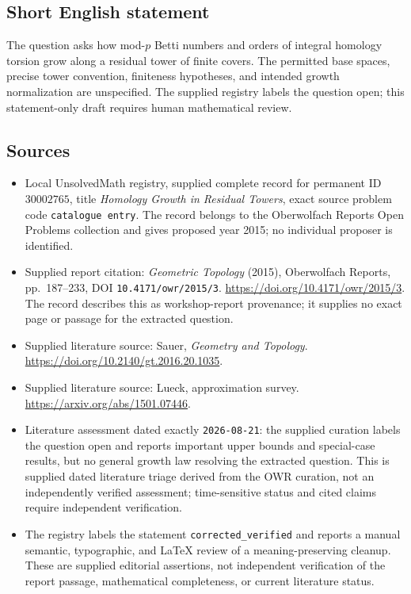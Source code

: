 \documentclass[11pt]{article}
\begin{document}
\subsection{Short English statement}
The question asks how mod-\(p\) Betti numbers and orders of integral homology torsion grow along a residual tower of finite covers. The permitted base spaces, precise tower convention, finiteness hypotheses, and intended growth normalization are unspecified. The supplied registry labels the question open; this statement-only draft requires human mathematical review.
\subsection{Sources}
\begin{itemize}
\item Local UnsolvedMath registry, supplied complete record for permanent ID \(30002765\), title \emph{Homology Growth in Residual Towers}, exact source problem code \texttt{catalogue entry}. The record belongs to the Oberwolfach Reports Open Problems collection and gives proposed year 2015; no individual proposer is identified.
\item Supplied report citation: \emph{Geometric Topology} (2015), Oberwolfach Reports, pp.~187--233, DOI \texttt{10.4171/owr/2015/3}. \url{https://doi.org/10.4171/owr/2015/3}. The record describes this as workshop-report provenance; it supplies no exact page or passage for the extracted question.
\item Supplied literature source: Sauer, \emph{Geometry and Topology}. \url{https://doi.org/10.2140/gt.2016.20.1035}.
\item Supplied literature source: Lueck, approximation survey. \url{https://arxiv.org/abs/1501.07446}.
\item Literature assessment dated exactly \texttt{2026-08-21}: the supplied curation labels the question open and reports important upper bounds and special-case results, but no general growth law resolving the extracted question. This is supplied dated literature triage derived from the OWR curation, not an independently verified assessment; time-sensitive status and cited claims require independent verification.
\item The registry labels the statement \texttt{corrected\_verified} and reports a manual semantic, typographic, and LaTeX review of a meaning-preserving cleanup. These are supplied editorial assertions, not independent verification of the report passage, mathematical completeness, or current literature status.
\end{itemize}
\end{document}
